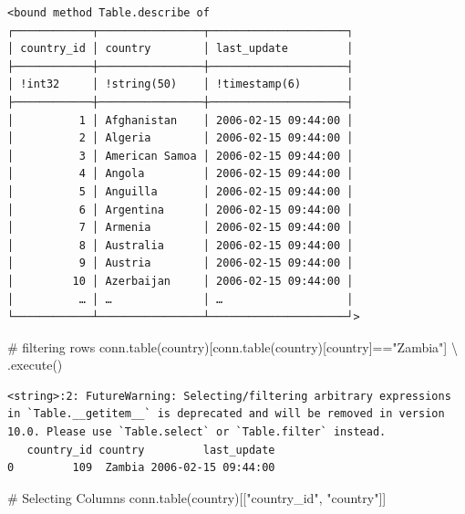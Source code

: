 \documentclass[
  letterpaper,
  DIV=11,
  numbers=noendperiod]{scrreprt}
\newenvironment{Shaded}{\begin{snugshade}}{\end{snugshade}}
\newcommand{\CommentTok}[1]{\textcolor[rgb]{0.37,0.37,0.37}{#1}}
\newcommand{\NormalTok}[1]{\textcolor[rgb]{0.00,0.23,0.31}{#1}}
\newcommand{\OperatorTok}[1]{\textcolor[rgb]{0.37,0.37,0.37}{#1}}
\newcommand{\StringTok}[1]{\textcolor[rgb]{0.13,0.47,0.30}{#1}}
\begin{document}
\begin{verbatim}
<bound method Table.describe of ┌────────────┬────────────────┬─────────────────────┐
│ country_id │ country        │ last_update         │
├────────────┼────────────────┼─────────────────────┤
│ !int32     │ !string(50)    │ !timestamp(6)       │
├────────────┼────────────────┼─────────────────────┤
│          1 │ Afghanistan    │ 2006-02-15 09:44:00 │
│          2 │ Algeria        │ 2006-02-15 09:44:00 │
│          3 │ American Samoa │ 2006-02-15 09:44:00 │
│          4 │ Angola         │ 2006-02-15 09:44:00 │
│          5 │ Anguilla       │ 2006-02-15 09:44:00 │
│          6 │ Argentina      │ 2006-02-15 09:44:00 │
│          7 │ Armenia        │ 2006-02-15 09:44:00 │
│          8 │ Australia      │ 2006-02-15 09:44:00 │
│          9 │ Austria        │ 2006-02-15 09:44:00 │
│         10 │ Azerbaijan     │ 2006-02-15 09:44:00 │
│          … │ …              │ …                   │
└────────────┴────────────────┴─────────────────────┘>
\end{verbatim}

\begin{Shaded}
\begin{Highlighting}[]
\CommentTok{\# filtering rows    }
\NormalTok{conn.table(}\StringTok{\textquotesingle{}country\textquotesingle{}}\NormalTok{)[conn.table(}\StringTok{\textquotesingle{}country\textquotesingle{}}\NormalTok{)[}\StringTok{\textquotesingle{}country\textquotesingle{}}\NormalTok{]}\OperatorTok{==}\StringTok{"Zambia"}\NormalTok{] }\OperatorTok{\textbackslash{}}
\NormalTok{    .execute()}
\end{Highlighting}
\end{Shaded}

\begin{verbatim}
<string>:2: FutureWarning: Selecting/filtering arbitrary expressions in `Table.__getitem__` is deprecated and will be removed in version 10.0. Please use `Table.select` or `Table.filter` instead.
   country_id country         last_update
0         109  Zambia 2006-02-15 09:44:00
\end{verbatim}

\begin{Shaded}
\begin{Highlighting}[]
\CommentTok{\# Selecting Columns }
\NormalTok{conn.table(}\StringTok{\textquotesingle{}country\textquotesingle{}}\NormalTok{)[[}\StringTok{"country\_id"}\NormalTok{, }\StringTok{"country"}\NormalTok{]]}
\end{Highlighting}
\end{Shaded}
\end{document}

